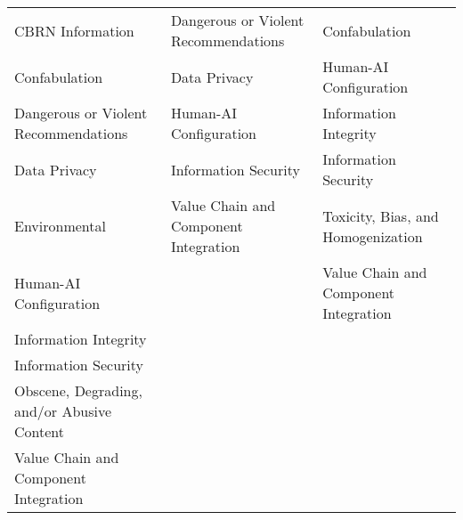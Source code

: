 \documentclass[fleqn]{article}
\begin{document}
\begin{landscape}
\begin{table}[H]
\begin{tabular}{lll}
		\midrule
		CBRN Information & Dangerous or Violent Recommendations & Confabulation \\
		Confabulation & Data Privacy & Human-AI Configuration \\
		Dangerous or Violent Recommendations & Human-AI Configuration & Information Integrity \\
		Data Privacy & Information Security & Information Security \\
		Environmental & Value Chain and Component Integration & Toxicity, Bias, and Homogenization \\
		Human-AI Configuration &  & Value Chain and Component Integration \\
		Information Integrity &  &  \\
		Information Security &  &  \\
		Obscene, Degrading, and/or Abusive Content &  &  \\
		Value Chain and Component Integration &  &  \\
		\bottomrule
	\end{tabular}
\end{table}
\vfill
\raisebox{-10pt}{\makebox[\linewidth]{\thepage}}
\end{landscape}
\end{document}
